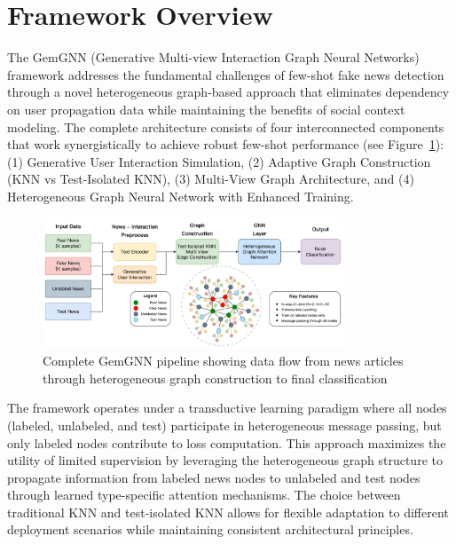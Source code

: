 
\section{Framework Overview}

The GemGNN (Generative Multi-view Interaction Graph Neural Networks) framework addresses the fundamental challenges of few-shot fake news detection through a novel heterogeneous graph-based approach that eliminates dependency on user propagation data while maintaining the benefits of social context modeling. The complete architecture consists of four interconnected components that work synergistically to achieve robust few-shot performance (see Figure~\ref{fig:pipeline}): (1) Generative User Interaction Simulation, (2) Adaptive Graph Construction (KNN vs Test-Isolated KNN), (3) Multi-View Graph Architecture, and (4) Heterogeneous Graph Neural Network with Enhanced Training.

\begin{figure}[h]
    \centering
    \includegraphics[width=0.8\textwidth]{context/methodology/fig/pipeline.png}
    \caption{Complete GemGNN pipeline showing data flow from news articles through heterogeneous graph construction to final classification}
    \label{fig:pipeline}
\end{figure}

The framework operates under a transductive learning paradigm where all nodes (labeled, unlabeled, and test) participate in heterogeneous message passing, but only labeled nodes contribute to loss computation. This approach maximizes the utility of limited supervision by leveraging the heterogeneous graph structure to propagate information from labeled news nodes to unlabeled and test nodes through learned type-specific attention mechanisms. The choice between traditional KNN and test-isolated KNN allows for flexible adaptation to different deployment scenarios while maintaining consistent architectural principles.

